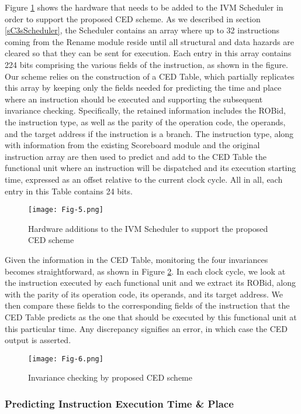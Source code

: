 \documentclass[12pt]{yalephd}
\begin{document}
Figure \ref{sC3fexe_time_pred} shows the hardware that needs to be added to the IVM Scheduler in order to support the proposed CED scheme. As we described in section \ref{sC3sScheduler}, the Scheduler contains an array where up to 32 instructions coming from the Rename module reside until all structural and data hazards are cleared so that they can be sent for execution. Each entry in this array contains 224 bits comprising the various fields of the instruction, as shown in the figure. Our scheme relies on the construction of a CED Table, which partially replicates this array by keeping only the fields needed for predicting the time and place where an instruction should be executed and supporting the subsequent invariance checking. Specifically, the retained information includes the ROBid, the instruction type, as well as the parity of the operation code, the operands, and the target address if the instruction is a branch. The instruction type, along with information from the existing Scoreboard module and the original instruction array are then used to predict and add to the CED Table the functional unit where an instruction will be dispatched and its execution starting time, expressed as an offset relative to the current clock cycle. All in all, each entry in this Table contains 24 bits.

\begin{figure}[!ht]
\centering
\texttt{[image: Fig-5.png]}
\caption{Hardware additions to the IVM Scheduler to support the proposed CED scheme}\label{sC3fexe_time_pred}
\end{figure}

Given the information in the CED Table, monitoring the four invariances becomes straightforward, as shown in Figure \ref{sC3finvariance}. In each clock cycle, we look at the instruction executed by each functional unit and we extract its ROBid, along with the parity of its operation code, its operands, and its target address. We then compare these fields to the corresponding fields of the instruction that the CED Table predicts as the one that should be executed by this functional unit at this particular time. Any discrepancy signifies an error, in which case the CED output is asserted.


\begin{figure}[!ht]
\centering
\texttt{[image: Fig-6.png]}
\caption{Invariance checking by proposed CED scheme}\label{sC3finvariance}
\end{figure}


\subsubsection{Predicting Instruction Execution Time \& Place}\label{sC3sTimePlace}
\end{document}
